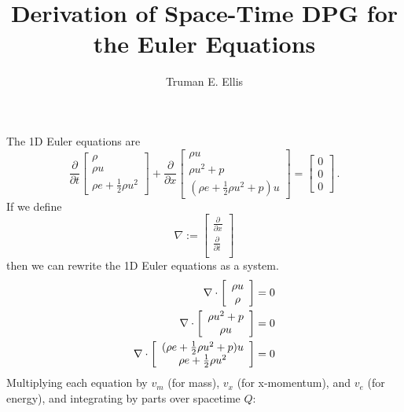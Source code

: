 \documentclass{article}
\author{Truman E. Ellis}
\title{Derivation of Space-Time DPG for the Euler Equations}
\begin{document}
\maketitle

The 1D Euler equations are
\[
\frac{\partial}{\partial t}
\left[
\begin{array}{c}
   \rho\\
   \rho u\\
   \rho e + \frac{1}{2}\rho u^2
\end{array}
\right]
+
\frac{\partial}{\partial x}
\left[
\begin{array}{c}
   \rho u\\
   \rho u^2+p\\
   (\rho e+\frac{1}{2}\rho u^2+p)u
\end{array}
\right]
=
\left[
\begin{array}{c}
   0\\
   0\\
   0
\end{array}
\right]\,.
\]
If we define
\[
\nabla:=
\left[
\begin{array}{c}
   \frac{\partial}{\partial x}\\
   \frac{\partial}{\partial t}\\
\end{array}
\right]
\]
then we can rewrite the 1D Euler equations as a system.
\begin{align*}
\nabla\cdot
\left[
\begin{array}{c}
   \rho u\\
   \rho\\
\end{array}
\right]
&=0\\
\nabla\cdot
\left[
\begin{array}{c}
   \rho u^2+p\\
   \rho u\\
\end{array}
\right]
&=0\\
\nabla\cdot
\left[
\begin{array}{c}
   (\rho e + \frac{1}{2}\rho u^2 + p)u\\
   \rho e + \frac{1}{2}\rho u^2\\
\end{array}
\right]
&=0
\end{align*}
Multiplying each equation by $v_m$ (for mass), $v_x$ (for x-momentum), and
$v_e$ (for energy), and integrating by parts over spacetime $Q$:
\end{document}

